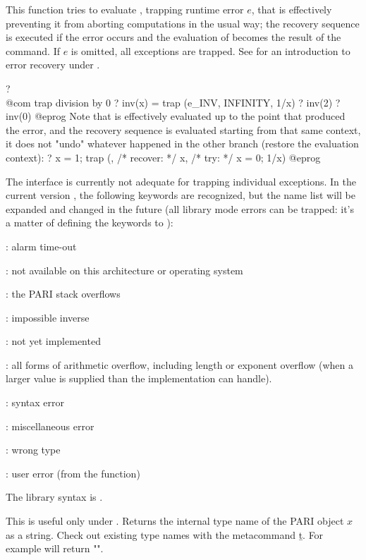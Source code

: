 {This function tries to
evaluate , trapping runtime error $e$, that is effectively preventing
it from aborting computations in the usual way; the recovery sequence
 is executed if the error occurs and the evaluation of 
becomes the result of the command. If $e$ is omitted, all exceptions are
trapped. See  for an introduction to error recovery
under .

\bprog
? \\@com trap division by 0
? inv(x) = trap (e_INV, INFINITY, 1/x)
? inv(2)
? inv(0)
@eprog\noindent
Note that  is effectively evaluated up to the point that produced
the error, and the recovery sequence is evaluated starting from that same
context, it does not "undo" whatever happened in the other branch (restore
the evaluation context):
\bprog
? x = 1; trap (, /* recover: */ x, /* try: */ x = 0; 1/x)
@eprog

 The interface is currently not adequate for trapping
individual exceptions. In the current version \vers, the following keywords
are recognized, but the name list will be expanded and changed in the
future (all library mode errors can be trapped: it's a matter of defining
the keywords to ):

: alarm time-out

: not available on this architecture or operating system

: the PARI stack overflows

: impossible inverse

: not yet implemented

: all forms of arithmetic overflow, including length
or exponent overflow (when a larger value is supplied than the
implementation can handle).

: syntax error

: miscellaneous error

: wrong type

: user error (from the  function)

The library syntax is .

\label{se:type}
This is useful only under . Returns the internal type name of
the PARI object $x$ as a  string. Check out existing type names with the
metacommand \b{t}. For example  will return "".

}
